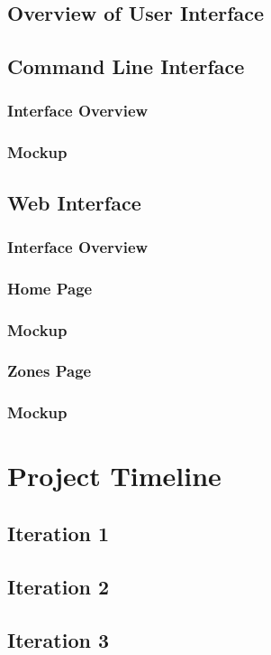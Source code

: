 \documentclass[onecolumn, draftclsnofoot,10pt, compsoc]{IEEEtran}
\begin{document}
		\subsection{Overview of User Interface}
		\subsection{Command Line Interface}
			\subsubsection{Interface Overview}
			\subsubsection{Mockup}
		\subsection{Web Interface}
			\subsubsection{Interface Overview}
			\subsubsection{Home Page}
			\subsubsection{Mockup}
			\subsubsection{Zones Page}
			\subsubsection{Mockup}

	\section{Project Timeline}
		\subsection{Iteration 1}
		\subsection{Iteration 2}
		\subsection{Iteration 3}
\end{document}
